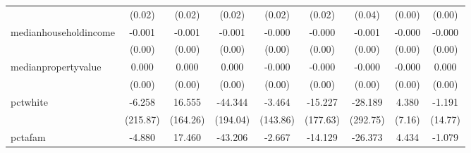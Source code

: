 {\begin{tabular}{l*{8}{c}}
            &                   (0.02)         &                   (0.02)         &                   (0.02)         &                   (0.02)         &                   (0.02)         &                   (0.04)         &                   (0.00)         &                   (0.00)         \\
medianhouseholdincome&                   -0.001         &                   -0.001         &                   -0.001         &                   -0.000         &                   -0.000         &                   -0.001         &                   -0.000         &                   -0.000\sym{**} \\
            &                   (0.00)         &                   (0.00)         &                   (0.00)         &                   (0.00)         &                   (0.00)         &                   (0.00)         &                   (0.00)         &                   (0.00)         \\
medianpropertyvalue&                    0.000         &                    0.000         &                    0.000         &                   -0.000         &                   -0.000         &                   -0.000         &                   -0.000         &                    0.000         \\
            &                   (0.00)         &                   (0.00)         &                   (0.00)         &                   (0.00)         &                   (0.00)         &                   (0.00)         &                   (0.00)         &                   (0.00)         \\
pctwhite    &                   -6.258         &                   16.555         &                  -44.344         &                   -3.464         &                  -15.227         &                  -28.189         &                    4.380         &                   -1.191         \\
            &                 (215.87)         &                 (164.26)         &                 (194.04)         &                 (143.86)         &                 (177.63)         &                 (292.75)         &                   (7.16)         &                  (14.77)         \\
pctafam     &                   -4.880         &                   17.460         &                  -43.206         &                   -2.667         &                  -14.129         &                  -26.373         &                    4.434         &                   -1.079         \\

\end{tabular}}
